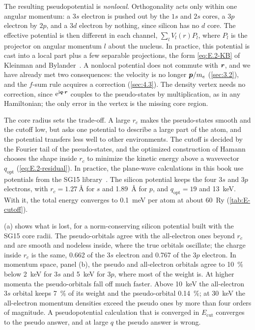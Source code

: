 The resulting pseudopotential is \emph{nonlocal}. Orthogonality acts only within one angular momentum: a $3s$ electron is pushed out by the $1s$ and $2s$ cores, a $3p$ electron by $2p$, and a $3d$ electron by nothing, since silicon has no $d$ core. The effective potential is then different in each channel, $\sum_lV_l(r)P_l$, where $P_l$ is the projector on angular momentum $l$ about the nucleus. In practice, this potential is cast into a local part plus a few separable projections, the form \cref{eq:E.2-KB} of Kleinman and Bylander~\cite{kleinman1982efficacious}. A nonlocal potential does not commute with $\bm{r}$, and we have already met two consequences: the velocity is no longer $\bm{p}/m_e$ (\cref{sec:3.2}), and the $f$-sum rule acquires a correction (\cref{sec:4.3}). The density vertex needs no correction, since $\mathrm{e}^{\mathrm{i}\bm{q}\cdot\bm{r}}$ couples to the pseudo-states by multiplication, as in any Hamiltonian; the only error in the vertex is the missing core region.

The core radius sets the trade-off. A large $r_c$ makes the pseudo-states smooth and the cutoff low, but asks one potential to describe a large part of the atom, and the potential transfers less well to other environments. The cutoff is decided by the Fourier tail of the pseudo-states, and the optimized construction of Hamann chooses the shape inside $r_c$ to minimize the kinetic energy above a wavevector $q_{\mathrm{opt}}$ (\cref{eq:E.2-residual}). In practice, the plane-wave calculations in this book use potentials from the SG15 library~\cite{schlipf2015optimization}. The silicon potential keeps the four $3s$ and $3p$ electrons, with $r_c = \SI{1.27}{\angstrom}$ for $s$ and \SI{1.89}{\angstrom} for $p$, and $q_{\mathrm{opt}} = 19$ and \SI{13}{keV}. With it, the total energy converges to \SI{0.1}{meV} per atom at about \SI{60}{Ry} (\cref{tab:E-cutoff}).

(a) shows what is lost, for a norm-conserving silicon potential built with the SG15 core radii. The pseudo-orbitals agree with the all-electron ones beyond $r_c$ and are smooth and nodeless inside, where the true orbitals oscillate; the charge inside $r_c$ is the same, 0.662 of the $3s$ electron and 0.767 of the $3p$ electron. In momentum space, panel (b), the pseudo and all-electron orbitals agree to \SI{10}{\percent} below \SI{2}{keV} for $3s$ and \SI{5}{keV} for $3p$, where most of the weight is. At higher momenta the pseudo-orbitals fall off much faster. Above \SI{10}{keV} the all-electron $3s$ orbital keeps \SI{7}{\percent} of its weight and the pseudo-orbital \SI{0.14}{\percent}; at \SI{30}{keV} the all-electron momentum densities exceed the pseudo ones by more than four orders of magnitude. A pseudopotential calculation that is converged in $E_{\mathrm{cut}}$ converges to the pseudo answer, and at large $q$ the pseudo answer is wrong.

